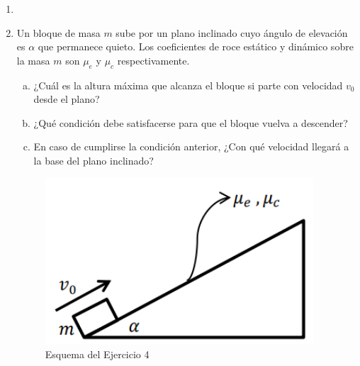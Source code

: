 \documentclass[letterpaper,11pt]{article}
\begin{document}
\vspace{-1cm}
\begin{enumerate}\setlength{\itemsep}{0.4cm}


\item[]

\item Un bloque de masa $m$ sube por un plano inclinado cuyo ángulo de elevación es $\alpha$ que permanece quieto. Los coeficientes de roce estático y dinámico sobre la masa $m$ son $\mu_e$ y $\mu_c$ respectivamente.

\begin{enumerate}[(a)]
    \item ¿Cuál es la altura máxima que alcanza el bloque si parte con velocidad $v_0$ desde el plano?
    \item ¿Qué condición debe satisfacerse para que el bloque vuelva a descender?
    \item En caso de cumplirse la condición anterior, ¿Con qué velocidad llegará a la base del plano inclinado?
\end{enumerate}

\begin{figure}[H]
    \centering
    \includegraphics[width=10cm]{2021-2/img/ejercicios/imagen_ej4.png}
    \caption{Esquema del Ejercicio 4}
    \label{fig:ej4}
\end{figure}

%   

\end{enumerate}
\end{document}
